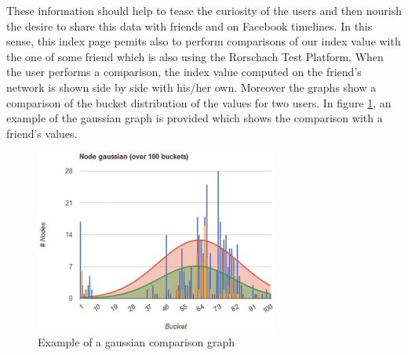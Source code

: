 These information should help to tease the curiosity of the users and then nourish the desire to share this data with friends and on Facebook timelines.
In this sense, this index page pemits also to perform comparisons of our index value with the one of some friend which is also using the Rorschach Test Platform.
When the user performs a comparison, the index value computed on the friend's network is shown side by side with his/her own.
Moreover the graphs show a comparison of the bucket distribution of the values for two users.
In figure \ref{fig:comparison}, an example of the gaussian graph is provided which shows the comparison with a friend's values.

\begin{figure}[h]
\centering
\includegraphics[width=8cm]{Fig8comparison.eps}
\caption{Example of a gaussian comparison graph}
\label{fig:comparison}
\end{figure}

\label{sec:netstatistics}
